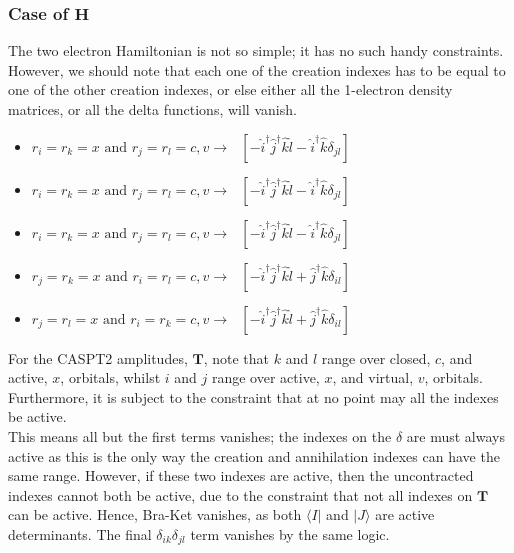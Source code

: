 \documentclass[12pt]{article}
\begin{document}
\subsubsection{ Case of $\mathbf{H}$ } 
The two electron Hamiltonian is not so simple; it has no such handy constraints. However, we should note
that each one of the creation indexes has to be equal to one of the other creation indexes, or else either all
the 1-electron density matrices, or all the delta functions, will vanish.

\begin{itemize}
\item $r_{i} = r_{k} = x \text{ \ and \ } r_{j} = r_{l} = c,v  \rightarrow \text{ \ \ \ \ } 
[- \hat{i}^{\dagger} \hat{j}^{\dagger} \hat{k}\hat{l} - \hat{i}^{\dagger} \hat{k} \delta_{jl}]$\\

\item $r_{i} = r_{k} = x \text{ \ and \ } r_{j} = r_{l} = c,v  \rightarrow \text{ \ \ \ \ } 
[- \hat{i}^{\dagger} \hat{j}^{\dagger} \hat{k}\hat{l} - \hat{i}^{\dagger} \hat{k} \delta_{jl}]$\\

\item $r_{i} = r_{k} = x \text{ \ and \ } r_{j} = r_{l} = c,v  \rightarrow \text{ \ \ \ \ } 
[- \hat{i}^{\dagger} \hat{j}^{\dagger} \hat{k}\hat{l} - \hat{i}^{\dagger} \hat{k} \delta_{jl}]$\\

\item $r_{j} = r_{k} = x \text{ \ and \ } r_{i} = r_{l} = c,v  \rightarrow \text{ \ \ \ \ } 
[- \hat{i}^{\dagger} \hat{j}^{\dagger} \hat{k}\hat{l} + \hat{j}^{\dagger} \hat{k} \delta_{il}]$\\

\item $r_{j} = r_{l} = x \text{ \ and \ } r_{i} = r_{k} = c,v  \rightarrow \text{ \ \ \ \ } 
[- \hat{i}^{\dagger} \hat{j}^{\dagger} \hat{k}\hat{l} + \hat{j}^{\dagger} \hat{k} \delta_{il}]$\\
\end{itemize}

For the CASPT2 amplitudes, $\mathbf{T}$, note that $k$ and $l$  range over closed, $c$, and active, $x$, orbitals, whilst 
$i$ and $j$ range over active, $x$, and virtual, $v$, orbitals. Furthermore, it is subject to the constraint that
at no point may all the indexes be active.\\

\noindent This means all but the first terms vanishes; the indexes on the  $\delta$ are must always active as 
this is the only way the creation and annihilation indexes can have the same range. However, if these
two indexes are active, then the uncontracted indexes cannot both be active, due to the constraint
that not all indexes on $\mathbf{T}$ can be active. Hence, Bra-Ket vanishes, as both $\langle I | $ and
$| J \rangle $ are active determinants. The final $\delta_{ik}\delta_{jl}$ term vanishes by the same logic.\\
\end{document}

